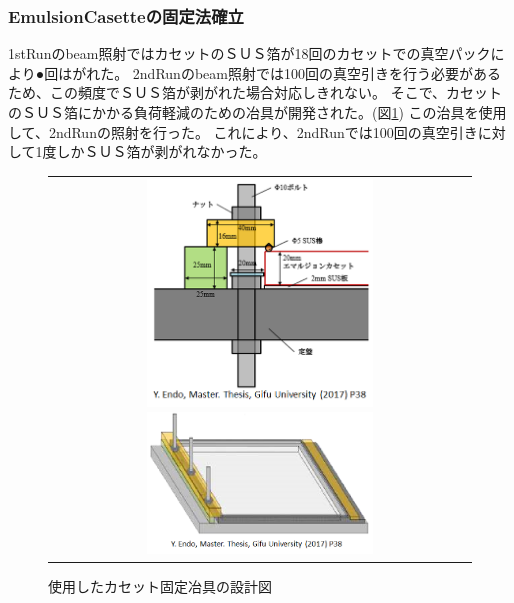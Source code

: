 \documentclass[12pt,a4paper]{jarticle}
\begin{document}
\subsubsection{EmulsionCasetteの固定法確立}
1stRunのbeam照射ではカセットのＳＵＳ箔が18回のカセットでの真空パックにより●回はがれた。
2ndRunのbeam照射では100回の真空引きを行う必要があるため、この頻度でＳＵＳ箔が剥がれた場合対応しきれない。
そこで、カセットのＳＵＳ箔にかかる負荷軽減のための冶具が開発された。(図\ref{fig:casette_fix})
この治具を使用して、2ndRunの照射を行った。
これにより、2ndRunでは100回の真空引きに対して1度しかＳＵＳ箔が剥がれなかった。
\begin{figure}[htbp]
  \centering
      \begin{tabular}{c}
        \begin{minipage}{0.5\hsize}
          \centering
            \includegraphics[clip, width=60mm]{casette_fix_moderu.png}
        \end{minipage}
        
        \begin{minipage}{0.5\hsize}
          \centering
            \includegraphics[clip, width=60mm]{casettefix.png}
        \end{minipage}
    
      \end{tabular}
      \caption{使用したカセット固定冶具の設計図\label{fig:casette_fix}}
\end{figure}
\newpage
\end{document}
